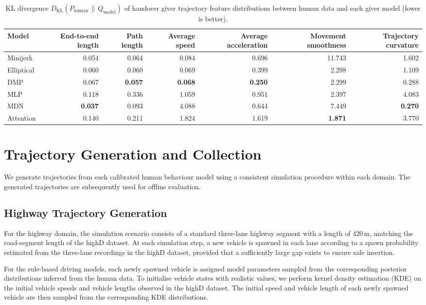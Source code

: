\documentclass[journal]{IEEEtran}
\begin{document}
\begin{table}[th]
\centering
\caption{KL divergence $D_{\mathrm{KL}}(P_{\text{human}} \,\|\, Q_{\text{model}})$ of handover giver trajectory feature distributions between human data and each giver model (lower is better).}
\label{tab:giver_feature_kl}
\begin{tabular}{lrrrrrr}
\toprule
Model & End-to-end length & Path length & Average speed & Average acceleration & Movement smoothness & Trajectory curvature \\
\midrule
Minijerk & 0.054 & 0.064 & 0.084 & 0.696 & 11.743 & 1.602 \\
Elliptical & 0.060 & 0.060 & 0.069 & 0.399 & 2.298 & 1.109 \\
DMP & 0.067 & \textbf{0.057} & \textbf{0.068} & \textbf{0.250} & 2.299 & 0.288 \\
MLP & 0.118 & 0.336 & 1.059 & 0.951 & 2.397 & 4.083 \\
MDN & \textbf{0.037} & 0.093 & 4.088 & 0.644 & 7.449 & \textbf{0.270} \\
Attention & 0.140 & 0.211 & 1.824 & 1.619 & \textbf{1.871} & 3.770 \\
\bottomrule
\end{tabular}
\end{table}

\section{Trajectory Generation and Collection}
\label{sec:suppTrajectoryCollection}

We generate trajectories from each calibrated human behaviour model using a consistent simulation procedure within each domain. The generated trajectories are subsequently used for offline evaluation.

\subsection{Highway Trajectory Generation}

For the highway domain, the simulation scenario consists of a standard three-lane highway segment with a length of $420\,\mathrm{m}$, matching the road-segment length of the highD dataset. At each simulation step, a new vehicle is spawned in each lane according to a spawn probability estimated from the three-lane recordings in the highD dataset, provided that a sufficiently large gap exists to ensure safe insertion.

For the rule-based driving models, each newly spawned vehicle is assigned model parameters sampled from the corresponding posterior distributions inferred from the human data. To initialise vehicle states with realistic values, we perform kernel density estimation (KDE) on the initial vehicle speeds and vehicle lengths observed in the highD dataset. The initial speed and vehicle length of each newly spawned vehicle are then sampled from the corresponding KDE distributions.
\end{document}
